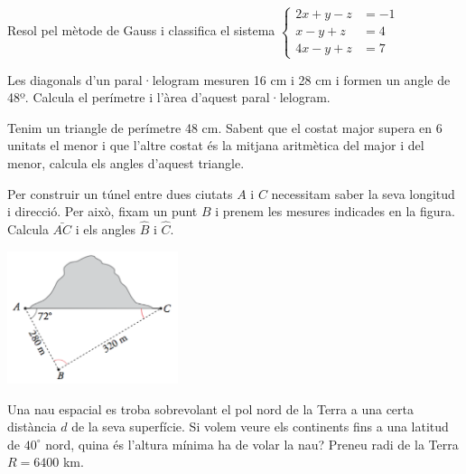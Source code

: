\begin{mylist}
\exer[2] Resol pel mètode de Gauss i classifica el sistema $\left\{ \begin{array}{ll} 
2x+y-z &=-1 \\ x-y+z &= 4 \\ 4x-y+z &=7 
\end{array}\right.$

\exer[2] Les diagonals d'un paral·lelogram mesuren 16 cm i 28 cm i formen un angle de 48º. Calcula el perímetre i l'àrea d'aquest paral·lelogram.
 
\exer[2] Tenim un triangle de perímetre 48 cm. Sabent que el costat major supera en 6 unitats el menor i que l'altre costat és la mitjana aritmètica del major i del menor, calcula els angles d'aquest triangle.

\exer[2] 
\begin{minipage}[t]{0.55\textwidth}
Per construir un túnel entre dues ciutats $A$ i $C$ necessitam saber la seva longitud i direcció. Per això, fixam un punt $B$ i prenem les mesures indicades en la figura. Calcula $\bar{AC}$ i els angles $\hat B$ i $\hat C$.
\end{minipage}
\begin{minipage}[c]{0.5\textwidth}
\begin{center}
	\includegraphics[width=5cm]{img-04-bloc1/bloc1-fig1.png}
\end{center}
\end{minipage}

\exer[2] Una nau espacial es troba sobrevolant el pol nord de la Terra a una certa distància $d$ de la seva superfície. Si volem veure els continents fins a una latitud de $40^\circ$ nord, quina és l'altura mínima ha de volar la nau? Preneu radi de la Terra $R=6400$ km.


\end{mylist}

